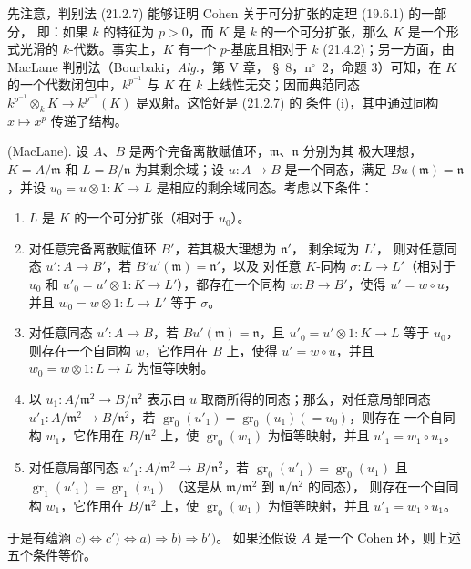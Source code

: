 \begin{env}[21.5.1]
\label{0.21.5.1-fr}
先注意，判别法 (21.2.7) 能够证明 Cohen 关于可分扩张的定理 (19.6.1) 的一部分，
即：如果 $k$ 的特征为 $p>0$，而 $K$ 是 $k$ 的一个可分扩张，那么 $K$
是一个形式光滑的 $k$-代数。事实上，$K$ 有一个 $p$-基底且相对于 $k$
(21.4.2)；另一方面，由 MacLane 判别法（Bourbaki，\emph{Alg.}，第 V 章，
§~8，n$^\circ$~2，命题 3）可知，在 $K$ 的一个代数闭包中，$k^{p^{-1}}$
与 $K$ 在 $k$ 上线性无交；因而典范同态
$k^{p^{-1}}\otimes_k K\to k^{p^{-1}}(K)$ 是双射。这恰好是 (21.2.7) 的
条件 (i)，其中通过同构 $x\mapsto x^p$ 传递了结构。
\end{env}
\begin{proposition}[21.5.2]
\label{0.21.5.2-fr}
\textnormal{(MacLane).}
设 $A$、$B$ 是两个完备离散赋值环，$\mathfrak m$、$\mathfrak n$ 分别为其
极大理想，$K=A/\mathfrak m$ 和 $L=B/\mathfrak n$ 为其剩余域；设
$u:A\to B$ 是一个同态，满足 $Bu(\mathfrak m)=\mathfrak n$，并设
$u_0=u\otimes 1:K\to L$ 是相应的剩余域同态。考虑以下条件：
\begin{enumerate}
  \item[\rm a)] $L$ 是 $K$ 的一个可分扩张（相对于 $u_0$）。
  \item[\rm b)] 对任意完备离散赋值环 $B'$，若其极大理想为 $\mathfrak n'$，
  剩余域为 $L'$，
  则对任意同态 $u':A\to B'$，若 $B'u'(\mathfrak m)=\mathfrak n'$，以及
  对任意 $K$-同构 $\sigma:L\to L'$（相对于 $u_0$ 和
  $u'_0=u'\otimes1:K\to L'$），都存在一个同构 $w:B\to B'$，使得
  $u'=w\circ u$，并且 $w_0=w\otimes1:L\to L'$ 等于 $\sigma$。
  \item[\rm b$'$)] 对任意同态 $u':A\to B$，若
  $Bu'(\mathfrak m)=\mathfrak n$，且 $u'_0=u'\otimes1:K\to L$ 等于 $u_0$，
  则存在一个自同构 $w$，它作用在 $B$ 上，使得 $u'=w\circ u$，并且
  $w_0=w\otimes1:L\to L$ 为恒等映射。
  \item[\rm c)] 以 $u_1:A/\mathfrak m^2\to B/\mathfrak n^2$ 表示由 $u$
  取商所得的同态；那么，对任意局部同态
  $u'_1:A/\mathfrak m^2\to B/\mathfrak n^2$，若
  $\operatorname{gr}_0(u'_1)=\operatorname{gr}_0(u_1)(=u_0)$，则存在
  一个自同构 $w_1$，它作用在 $B/\mathfrak n^2$ 上，使 $\operatorname{gr}_0(w_1)$
  为恒等映射，并且 $u'_1=w_1\circ u_1$。
  \item[\rm c$'$)] 对任意局部同态 $u'_1:A/\mathfrak m^2\to
  B/\mathfrak n^2$，若 $\operatorname{gr}_0(u'_1)=\operatorname{gr}_0(u_1)$
  且 $\operatorname{gr}_1(u'_1)=\operatorname{gr}_1(u_1)$
  （这是从 $\mathfrak m/\mathfrak m^2$ 到 $\mathfrak n/\mathfrak n^2$ 的同态），
  则存在一个自同构 $w_1$，它作用在 $B/\mathfrak n^2$ 上，使
  $\operatorname{gr}_0(w_1)$ 为恒等映射，并且 $u'_1=w_1\circ u_1$。
\end{enumerate}
于是有蕴涵 $c)\Leftrightarrow c')\Leftrightarrow a)\Rightarrow b) \Rightarrow b')$。
如果还假设 $A$ 是一个 Cohen 环，则上述五个条件等价。

\end{proposition}
